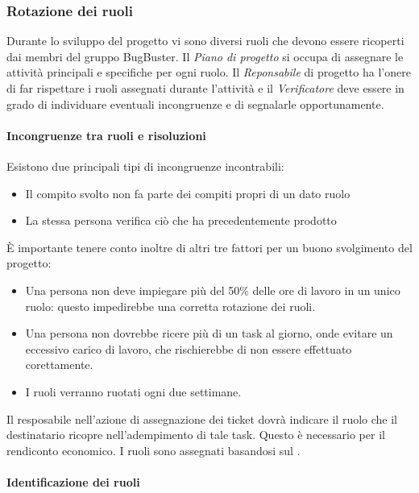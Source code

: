 \subsubsection{Rotazione dei ruoli}

Durante lo sviluppo del progetto vi sono diversi ruoli che devono essere ricoperti dai membri del gruppo BugBuster. Il \textit{Piano di progetto} si occupa di assegnare le attività principali e specifiche per ogni ruolo. Il \textit{Reponsabile} di progetto ha l'onere di far rispettare i ruoli assegnati durante l'attività e il \textit{Verificatore} deve essere in grado di individuare eventuali incongruenze e di segnalarle opportunamente.
\paragraph*{Incongruenze tra ruoli e risoluzioni}
Esistono due principali tipi di incongruenze incontrabili:
\begin{itemize}

\item Il compito svolto non fa parte dei compiti propri di un dato ruolo
\item La stessa persona verifica ciò che ha precedentemente prodotto
\end{itemize}

È importante tenere conto inoltre di altri tre fattori per un buono svolgimento del progetto:
\begin{itemize}

\item Una persona non deve impiegare più del 50\% delle ore di lavoro in un unico ruolo: questo impedirebbe una corretta rotazione dei ruoli.
\item Una persona non dovrebbe ricere più di un task al giorno, onde evitare un eccessivo carico di lavoro, che rischierebbe di non essere effettuato corettamente.
\item I ruoli verranno ruotati ogni due settimane.

\end{itemize}

Il resposabile nell'azione di assegnazione dei ticket dovr\`a indicare il ruolo che il destinatario ricopre nell'adempimento di tale task. Questo \`e necessario per il rendiconto economico. I ruoli sono assegnati basandosi sul \PianoDiProgetto.

\paragraph*{Identificazione dei ruoli}

